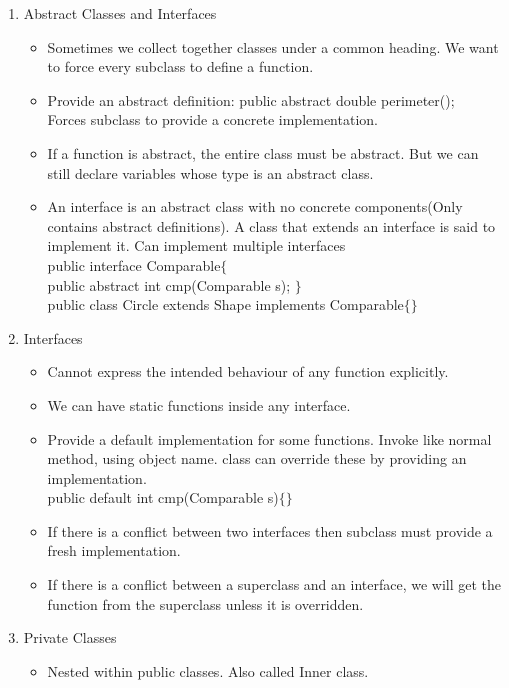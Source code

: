 \documentclass[a4paper]{article}
\begin{document}
\begin{enumerate}
    \item Abstract Classes and Interfaces
    \begin{itemize}
        \item Sometimes we collect together classes under a common heading. We want to force every subclass to define a function.
        \item Provide an abstract definition: public abstract double perimeter();\\
        Forces subclass to provide a concrete implementation.
        \item If a function is abstract, the entire class must be abstract. But we can still declare variables whose type is an abstract class.
        \item An interface is an abstract class with no concrete components(Only contains abstract definitions). A class that extends an interface is said to implement it. Can implement multiple interfaces\\
        public interface Comparable$\{$\\
        public abstract int cmp(Comparable s);
        $\}$\\
        public class Circle extends Shape implements Comparable$\{\}$
    \end{itemize}
    \item Interfaces
    \begin{itemize}
        \item Cannot express the intended behaviour of any function explicitly.
        \item We can have static functions inside any interface.
        \item Provide a default implementation for some functions. Invoke like normal method, using object name. class can override these by providing an implementation.\\
        public default int cmp(Comparable s)$\{\}$
        \item If there is a conflict between two interfaces then subclass must provide a fresh implementation.
        \item If there is a conflict between a  superclass and an interface, we will get the function from the superclass unless it is overridden.
    \end{itemize}
    \item Private Classes
    \begin{itemize}
        \item Nested within public classes. Also called Inner class.

\end{itemize}
\end{enumerate}
\end{document}
